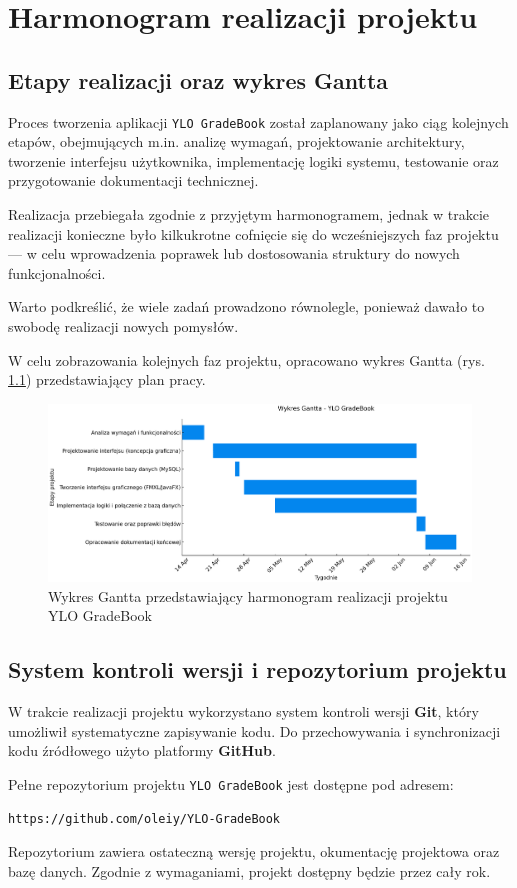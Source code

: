 \chapter{Harmonogram realizacji projektu}
\label{cha:harmonogram}

\section{Etapy realizacji oraz wykres Gantta}

Proces tworzenia aplikacji \texttt{YLO GradeBook} został zaplanowany jako ciąg kolejnych etapów, obejmujących m.in. analizę wymagań, projektowanie architektury, tworzenie interfejsu użytkownika, implementację logiki systemu, testowanie oraz przygotowanie dokumentacji technicznej.

Realizacja przebiegała zgodnie z przyjętym harmonogramem, jednak w trakcie realizacji konieczne było kilkukrotne cofnięcie się do wcześniejszych faz projektu — w celu wprowadzenia poprawek lub dostosowania struktury do nowych funkcjonalności.

Warto podkreślić, że wiele zadań prowadzono równolegle, ponieważ dawało to swobodę realizacji nowych pomysłów. 

W celu zobrazowania kolejnych faz projektu, opracowano wykres Gantta (rys. \ref{fig:ganttYLO}) przedstawiający plan pracy.


\begin{figure}[H]
    \centering
    \includegraphics[width=1\textwidth]{figures/fig_0004.eps}
    \caption{Wykres Gantta przedstawiający harmonogram realizacji projektu YLO GradeBook}
    \label{fig:ganttYLO}
\end{figure}

\section{System kontroli wersji i repozytorium projektu}

W trakcie realizacji projektu wykorzystano system kontroli wersji \textbf{Git}, który umożliwił systematyczne zapisywanie kodu.  Do przechowywania i synchronizacji kodu źródłowego użyto platformy \textbf{GitHub}.

Pełne repozytorium projektu \texttt{YLO GradeBook} jest dostępne pod adresem:

\begin{center}
\texttt{https://github.com/oleiy/YLO-GradeBook}
\end{center}

Repozytorium zawiera ostateczną wersję projektu, okumentację projektowa oraz bazę danych. Zgodnie z wymaganiami, projekt dostępny będzie przez cały rok.